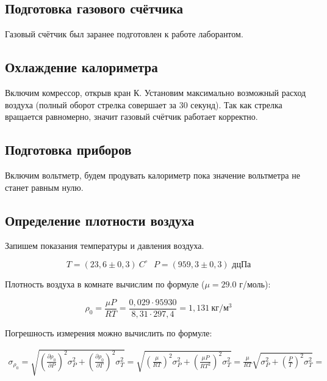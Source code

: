 \documentclass[a4paper,12pt]{article}
\begin{document}
\subsection{Подготовка газового счётчика}

Газовый счётчик был заранее подготовлен к работе лаборантом.

\subsection{Охлаждение калориметра}

Включим комрессор, открыв кран К. Установим максимально возможный расход воздуха (полный оборот стрелка совершает за 30 секунд). Так как стрелка вращается равномерно, значит газовый счётчик работает корректно.

\subsection{Подготовка приборов}

Включим вольтметр, будем продувать калориметр пока значение вольтметра не станет равным нулю.

\subsection{Определение плотности воздуха}
    
Запишем показания температуры и давления воздуха. 

\begin{equation}
    T = (23,6 \pm 0,3) \ C^\circ \ \ \ P = (959,3 \pm 0,3) \text{ дцПа} 
\end{equation}

Плотность воздуха в комнате вычислим по формуле ($\mu = 29.0$ г/моль):

\begin{equation}
    \rho_0 = \frac{\mu P}{RT} = \frac{0,029 \cdot 95930}{8,31 \cdot 297,4} = 1,131 \ \text{кг}/\text{м}^3
\end{equation}

Погрешность измерения можно вычислить по формуле:

\begin{multline*}
    \sigma_{\rho_0} = \sqrt{
    \left ( \frac{\partial \rho_0}{\partial P} \right )^2 \sigma_{P} ^ 2 +
    \left ( \frac{\partial \rho_0}{\partial T} \right )^2 \sigma_{T} ^ 2
    } = \sqrt{
    \left ( \frac{\mu}{RT} \right )^2 \sigma_{P} ^ 2 + 
    \left ( \frac{\mu P}{RT^2} \right )^2 \sigma_{T} ^ 2
    } = \frac{\mu}{RT} \sqrt{ \sigma_{P} ^ 2 + \left( \frac{P}{T} \right)^2 \sigma_{T} ^ 2} = 
\end{multline*}
\end{document}
